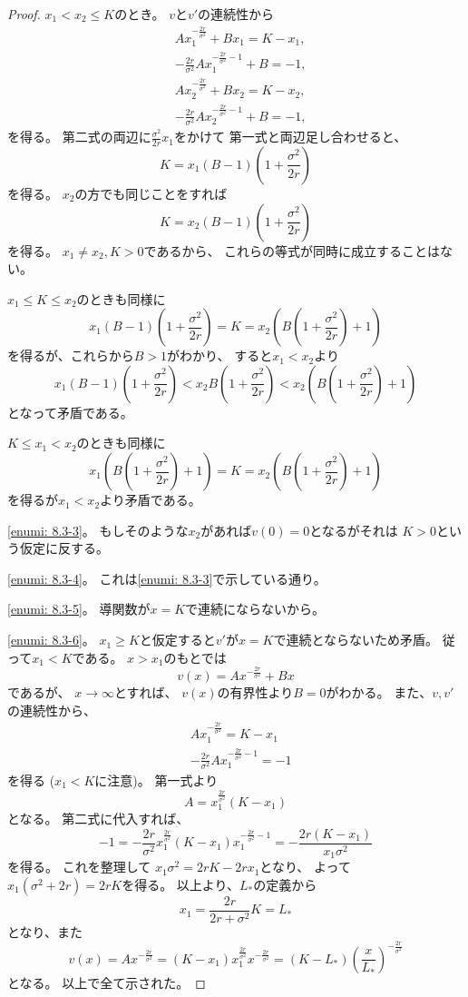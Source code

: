 \documentclass[uplatex]{jsarticle}
\theoremstyle{definition}
\begin{document}
\begin{proof}
  \(x_1 < x_2 \leq K\)のとき。
  \(v\)と\(v'\)の連続性から
  \begin{align*}
    &Ax_1^{-\frac{2r}{\sigma^2}} + Bx_1
    = K - x_1, \\
    &- \frac{2r}{\sigma^2}Ax_1^{-\frac{2r}{\sigma^2}-1} + B
    = -1, \\
    &Ax_2^{-\frac{2r}{\sigma^2}} + Bx_2
    = K - x_2, \\
    &- \frac{2r}{\sigma^2}Ax_2^{-\frac{2r}{\sigma^2}-1} + B
    = -1,
  \end{align*}
  を得る。
  第二式の両辺に\(\frac{\sigma^2}{2r}x_1\)をかけて
  第一式と両辺足し合わせると、
  \[K = x_1(B-1)\left( 1+\frac{\sigma^2}{2r} \right)\]
  を得る。
  \(x_2\)の方でも同じことをすれば
  \[K = x_2(B-1)\left( 1+\frac{\sigma^2}{2r} \right)\]
  を得る。
  \(x_1\neq x_2, K > 0\)であるから、
  これらの等式が同時に成立することはない。

  \(x_1 \leq K \leq x_2\)のときも同様に
  \[
  x_1(B-1)\left( 1+\frac{\sigma^2}{2r} \right)
  = K =
  x_2\left( B\left( 1+\frac{\sigma^2}{2r} \right) + 1 \right)
  \]
  を得るが、これらから\(B > 1\)がわかり、
  すると\(x_1 < x_2\)より
  \[
  x_1(B-1)\left( 1+\frac{\sigma^2}{2r} \right)
  < x_2B\left( 1+\frac{\sigma^2}{2r} \right)
  < x_2\left( B\left( 1+\frac{\sigma^2}{2r} \right) + 1 \right)
  \]
  となって矛盾である。

  \(K \leq x_1 < x_2\)のときも同様に
  \[
  x_1\left( B\left( 1+\frac{\sigma^2}{2r} \right) + 1 \right)
  = K =
  x_2\left( B\left( 1+\frac{\sigma^2}{2r} \right) + 1 \right)
  \]
  を得るが\(x_1 < x_2\)より矛盾である。

  \ref{enumi: 8.3-3}。
  もしそのような\(x_2\)があれば\(v(0)=0\)となるがそれは
  \(K>0\)という仮定に反する。

  \ref{enumi: 8.3-4}。
  これは\ref{enumi: 8.3-3}で示している通り。

  \ref{enumi: 8.3-5}。
  導関数が\(x=K\)で連続にならないから。

  \ref{enumi: 8.3-6}。
  \(x_1 \geq K\)と仮定すると\(v'\)が\(x=K\)で連続とならないため矛盾。
  従って\(x_1 < K\)である。
  \(x > x_1\)のもとでは
  \[
  v(x) = Ax^{-\frac{2r}{\sigma^2}} + Bx
  \]
  であるが、
  \(x\to \infty\)とすれば、
  \(v(x)\)の有界性より\(B=0\)がわかる。
  また、\(v,v'\)の連続性から、
  \begin{align*}
    &Ax_1^{-\frac{2r}{\sigma^2}} = K-x_1 \\
    &-\frac{2r}{\sigma^2}Ax_1^{-\frac{2r}{\sigma^2}-1}
    = -1
  \end{align*}
  を得る (\(x_1<K\)に注意)。
  第一式より
  \[
  A = x_1^{\frac{2r}{\sigma^2}}(K-x_1)
  \]
  となる。
  第二式に代入すれば、
  \[
  -1 = -\frac{2r}{\sigma^2}x_1^{\frac{2r}{\sigma^2}}(K-x_1)
  x_1^{-\frac{2r}{\sigma^2}-1}
  = -\frac{2r(K-x_1)}{x_1\sigma^2}
  \]
  を得る。
  これを整理して
  \(x_1\sigma^2 = 2rK-2rx_1\)となり、
  よって\(x_1(\sigma^2+2r)=2rK\)を得る。
  以上より、\(L_*\)の定義から
  \[x_1 = \frac{2r}{2r+\sigma^2}K = L_*\]
  となり、また
  \[
  v(x) = Ax^{-\frac{2r}{\sigma^2}}
  = (K-x_1)x_1^{\frac{2r}{\sigma^2}}x^{-\frac{2r}{\sigma^2}}
  = (K-L_*)\left( \frac{x}{L_*}\right)^{-\frac{2r}{\sigma^2}}
  \]
  となる。
  以上で全て示された。
\end{proof}
\end{document}
